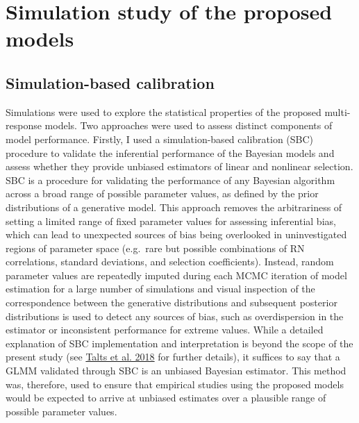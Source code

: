 \documentclass{article}
\begin{document}
\hypertarget{simulation-study-of-the-proposed-models}{%
\section{Simulation study of the proposed
models}\label{simulation-study-of-the-proposed-models}}

\hypertarget{simulation-based-calibration}{%
\subsection{Simulation-based
calibration}\label{simulation-based-calibration}}

Simulations were used to explore the statistical properties of the
proposed multi-response models. Two approaches were used to assess
distinct components of model performance. Firstly, I used a
simulation-based calibration (SBC) procedure to validate the inferential
performance of the Bayesian models and assess whether they provide
unbiased estimators of linear and nonlinear selection. SBC is a
procedure for validating the performance of any Bayesian algorithm
across a broad range of possible parameter values, as defined by the
prior distributions of a generative model. This approach removes the
arbitrariness of setting a limited range of fixed parameter values for
assessing inferential bias, which can lead to unexpected sources of bias
being overlooked in uninvestigated regions of parameter space (e.g.~rare
but possible combinations of RN correlations, standard deviations, and
selection coefficients). Instead, random parameter values are repeatedly
imputed during each MCMC iteration of model estimation for a large
number of simulations and visual inspection of the correspondence
between the generative distributions and subsequent posterior
distributions is used to detect any sources of bias, such as
overdispersion in the estimator or inconsistent performance for extreme
values. While a detailed explanation of SBC implementation and
interpretation is beyond the scope of the present study (see
\protect\hyperlink{ref-Talts2018}{Talts et al. 2018} for further
details), it suffices to say that a GLMM validated through SBC is an
unbiased Bayesian estimator. This method was, therefore, used to ensure
that empirical studies using the proposed models would be expected to
arrive at unbiased estimates over a plausible range of possible
parameter values.
\end{document}
